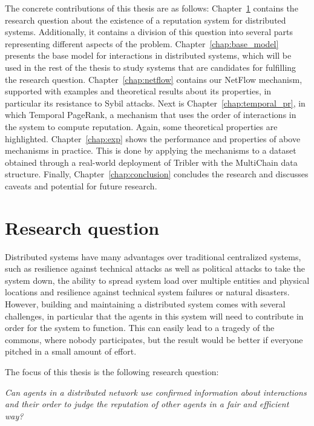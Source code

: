 \documentclass[a4paper,11pt]{book}
\theoremstyle{definition}
\begin{document}
The concrete contributions of this thesis are as follows: Chapter~\ref{chap:research_questions} contains
the research question about the existence of a reputation system for distributed systems.
Additionally, it contains a division of this question into several parts representing different aspects of the problem.
Chapter~\ref{chap:base_model} presents the base model for interactions in distributed systems, which will
be used in the rest of the thesis to study systems that are candidates for fulfilling the research question.
Chapter~\ref{chap:netflow} contains our NetFlow mechanism, supported with examples and theoretical results
about its properties, in particular its resistance to Sybil attacks. Next is Chapter~\ref{chap:temporal_pr}, 
in which Temporal PageRank, a mechanism that uses the order of interactions in the system to compute reputation.
Again, some theoretical properties are highlighted. Chapter~\ref{chap:exp} shows the performance and properties
of above mechanisms in practice. This is done by applying the mechanisms to a dataset obtained through
a real-world deployment of Tribler with the MultiChain data structure. Finally, Chapter~\ref{chap:conclusion}
concludes the research and discusses caveats and potential for future research.


\chapter{Research question}
\label{chap:research_questions}

Distributed systems have many advantages over traditional centralized
systems, such as resilience against technical attacks as well as political attacks to take the system down,
the ability to spread system load over multiple entities and physical locations and 
resilience against technical system failures or natural disasters.
 However, building and maintaining a distributed system comes with several challenges, in particular that
the agents in this system will need to contribute in order for the system to
function. This can easily lead to a tragedy of the commons, where nobody participates,
but the result would be better if everyone pitched in a small amount of effort.

The focus of this thesis is the following research question:
\begin{center}
    \emph{Can agents in a distributed network use confirmed information about
    interactions and their order to judge the reputation of other agents
    in a fair and efficient way?}
\end{center}
\end{document}
